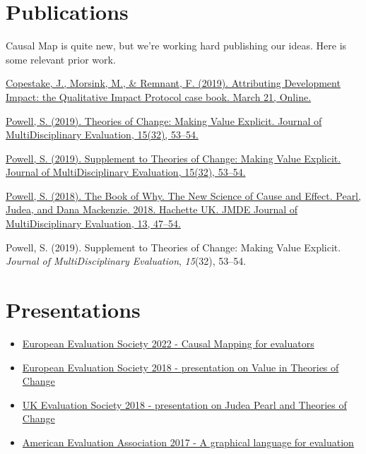 \documentclass[
]{book}
\providecommand{\tightlist}{%
  \setlength{\itemsep}{0pt}\setlength{\parskip}{0pt}}
\begin{document}
\hypertarget{publications}{%
\section{Publications}\label{publications}}

Causal Map is quite new, but we're working hard publishing our ideas. Here is some relevant prior work.

\href{https://practicalactionpublishing.com/book/105/attributing-development-impact}{Copestake, J., Morsink, M., \& Remnant, F. (2019). Attributing Development Impact: the Qualitative Impact Protocol case book. March 21, Online.}

\href{https://journals.sfu.ca/jmde/index.php/jmde_1/article/view/563}{Powell, S. (2019). Theories of Change: Making Value Explicit. Journal of MultiDisciplinary Evaluation, 15(32), 53--54.}

\href{https://journals.sfu.ca/jmde/index.php/jmde_1/article/view/561}{Powell, S. (2019). Supplement to Theories of Change: Making Value Explicit. Journal of MultiDisciplinary Evaluation, 15(32), 53--54.}

\href{https://journals.sfu.ca/jmde/index.php/jmde_1/article/view/507}{Powell, S. (2018). The Book of Why. The New Science of Cause and Effect. Pearl, Judea, and Dana Mackenzie. 2018. Hachette UK. JMDE Journal of MultiDisciplinary Evaluation, 13, 47--54.}

Powell, S. (2019). Supplement to Theories of Change: Making Value Explicit. \emph{Journal of MultiDisciplinary Evaluation}, \emph{15}(32), 53--54.

\hypertarget{presentations}{%
\section{Presentations}\label{presentations}}

\begin{itemize}
\tightlist
\item
  \href{https://drive.google.com/file/d/1nmSjMvGJYQTsm6-0hVZPfLbki1KEkJcB/view?usp=sharing}{European Evaluation Society 2022 - Causal Mapping for evaluators}
\item
  \href{https://drive.google.com/file/d/1FdiOs85iZCqZU6MdU3Lb5kgDOxq36G3b/view?usp=sharing}{European Evaluation Society 2018 - presentation on Value in Theories of Change}
\item
  \href{https://drive.google.com/file/d/1A2gIYmechpCot2QQc0TRWGlFg9r4jsz4/view?usp=sharing}{UK Evaluation Society 2018 - presentation on Judea Pearl and Theories of Change}
\item
  \href{http://comm.eval.org/viewdocument/theorymaker-a-graphical-language}{American Evaluation Association 2017 - A graphical language for evaluation}
\end{itemize}
\end{document}
